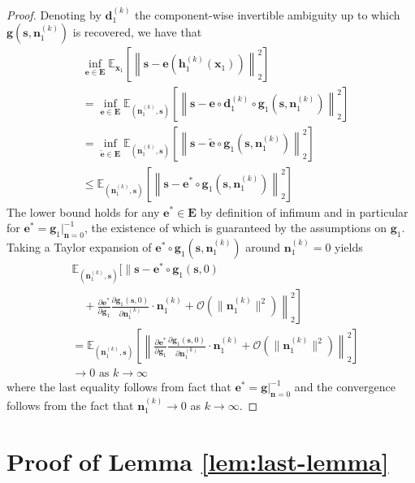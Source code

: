 \begin{proof}
	Denoting by $\bm{d}^{(k)}_1$ the component-wise invertible ambiguity up to which $\bm{g}(\bm{s}, \bm{n}_1^{(k)})$ is recovered, we have that
	\begin{align}
	&\inf_{\bm{e}\in \bm{E}} \mathbb{E}_{\bm{x}_1} \left[ \left \|\bm{s} - \bm{e}(\bm{h}_1^{(k)}(\bm{x}_1)) \right \|_2^2 \right]\\
	&=\inf_{\bm{e}\in \bm{E}} \mathbb{E}_{(\bm{n}_1^{(k)}, \bm{s})} \left[ \left \|\bm{s} - \bm{e} \circ \bm{d}^{(k)}_1 \circ \bm{g}_1(\bm{s}, \bm{n}_1^{(k)}) \right \|_2^2 \right]\\
	&=\inf_{\tilde{\bm{e}}\in \bm{E}} \mathbb{E}_{(\bm{n}_1^{(k)}, \bm{s})} \left[ \left \|\bm{s} - \tilde{\bm{e}} \circ  \bm{g}_1(\bm{s}, \bm{n}_1^{(k)}) \right \|_2^2 \right]  \\
	&\leq\mathbb{E}_{(\bm{n}_1^{(k)}, \bm{s})} \left[ \left \|\bm{s} - \bm{e^*} \circ  \bm{g}_1(\bm{s}, \bm{n}_1^{(k)}) \right \|_2^2 \right]\label{eq:low_bounded}
	\end{align}
	The lower bound holds for any $\bm{e^*}\in\bm{E}$ by definition of infimum and in particular for $\bm{e^*} = \bm{g}_1 |^{-1}_{\bm{n}=0}$, the existence of which is guaranteed by the assumptions on $\bm{g}_1$.
	Taking a Taylor expansion of $\bm{e^*} \circ  \bm{g}_1(\bm{s}, \bm{n}_1^{(k)})$ around $\bm{n}_1^{(k)}=0$ yields
	\begin{align*}
	&\mathbb{E}_{(\bm{n}_1^{(k)}, \bm{s})} \Bigg[  \Bigg\|\bm{s} - \bm{e^*} \circ \bm{g}_1 (\bm{s}, 0) \\
	&\quad+ \left.\left.\frac{\partial \bm{e^*}}{\partial \bm{g}_1} \frac{\partial \bm{g}_1 (\bm{s}, 0)}{\partial \bm{n}_1^{(k)}} \cdot \bm{n}_1^{(k)} + \mathcal{O}(\|\bm{n}_1^{(k)}\|^2) \right \|_2^2 \right]\\
	&=\mathbb{E}_{(\bm{n}_1^{(k)}, \bm{s})} \left[ \left \|\frac{\partial \bm{e^*}}{\partial \bm{g}_1} \frac{\partial \bm{g}_1 (\bm{s}, 0)}{\partial \bm{n}_1^{(k)}} \cdot \bm{n}_1^{(k)} + \mathcal{O}(\|\bm{n}_1^{(k)}\|^2) \right \|_2^2 \right]\\
	&\longrightarrow 0 \text{ as $k \longrightarrow \infty$}
	\end{align*}
	where the last equality follows from fact that $\bm{e^*} = \bm{g} |^{-1}_{\bm{n}=0}$ and the convergence follows from the fact that $\bm{n}_1^{(k)} \longrightarrow 0$ as $k \to \infty$.
\end{proof}



\section{Proof of Lemma \ref{lem:last-lemma}}
\label{appendix:last-lemma}



